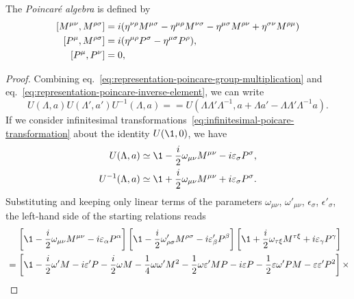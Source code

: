 The \emph{Poincaré algebra} is defined by
\begin{subequations}\label{eq:poincare-comm-relations}
    \begin{align}
        \comm{M^{\mu\nu}}{M^{\rho\sigma}} &= i ( \eta^{\nu\rho}M^{\mu\sigma} - \eta^{\mu\rho}M^{\nu\sigma} - \eta^{\mu\sigma}M^{\rho\nu} + \eta^{\sigma\nu}M^{\rho\mu}) \label{eq:comm-poincare-lorentz}\\
        \comm{P^\mu}{M^{\rho\sigma}} &= i (\eta^{\mu\rho} P^\sigma - \eta^{\mu\sigma} P^\rho),
        \label{eq:comm-poincare-lorentzmomentum}\\
        \comm{P^\mu}{P^\nu} &= 0 \label{eq:comm-poincare-momentum},
\end{align}
\end{subequations}
\begin{proof}
    Combining eq.~\eqref{eq:representation-poincare-group-multiplication} and eq.~\eqref{eq:representation-poincare-inverse-element}, we can write
    \begin{equation*}
        U(\Lambda, a) U(\Lambda',a') U^{-1}(\Lambda,a) =  = U(\Lambda \Lambda' \Lambda^{-1}, a + \Lambda a' - \Lambda \Lambda' \Lambda^{-1}a) .
    \end{equation*}
    If we consider infinitesimal transformations~\eqref{eq:infinitesimal-poicare-transformation} about the identity $U(\1,0)$, we have
    \begin{align*}
        U(\Lambda,a) &\simeq \1 -\frac{i}{2} \omega_{\mu\nu} M^{\mu\nu} - i \epsilon_\sigma P^\sigma, \\ 
        {U^{-1}}(\Lambda,a) &\simeq \1 +\frac{i}{2} \omega_{\mu\nu} M^{\mu\nu} + i \epsilon_\sigma P^\sigma .
    \end{align*}
    Substituting and keeping only linear terms of the parameters $\omega_{\mu\nu}$, $\omega'_{\mu\nu}$, $\epsilon_\sigma$, $\epsilon'_\sigma$, the left-hand side of the starting relations reads
    \begin{align*}
        &\quad \,\left[ \1 -\frac{i}{2} \omega_{\mu\nu} M^{\mu\nu} - i \epsilon_\alpha P^\alpha  \right] \left[ \1 -\frac{i}{2} \omega'_{\rho\sigma} M^{\rho\sigma} - i \epsilon'_\beta P^\beta  \right] \left[ \1 +\frac{i}{2} \omega_{\tau\xi} M^{\tau\xi} + i \epsilon_\gamma P^\gamma  \right] \\
        &=\left[ \1 - \frac{i}{2} \omega' M - i \epsilon' P - \frac{i}{2} \omega M - \frac{1}{4} \omega \omega' M^2 - \frac{1}{2} \omega \epsilon' M P - i \epsilon P - \frac{1}{2} \epsilon \omega' P M - \epsilon \epsilon' P^2 \right] \times \\

\end{align*}
\end{proof}
